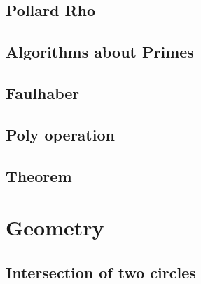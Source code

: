 \documentclass[a4paper,10pt,twocolumn,oneside]{article}
\begin{document}
\subsection{Pollard Rho}


\subsection{Algorithms about Primes}



% 

% 

\subsection{Faulhaber}


\subsection{Poly operation}


\subsection{Theorem}



\section{Geometry}
%

\subsection{Intersection of two circles}

\end{document}
